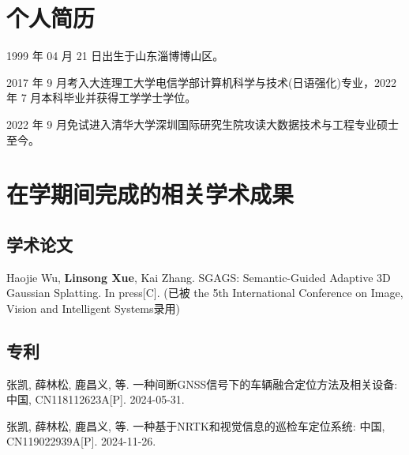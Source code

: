 
\begin{resume}

  \section*{个人简历}

  1999 年 04 月 21 日出生于山东淄博博山区。

  2017 年 9 月考入大连理工大学电信学部计算机科学与技术(日语强化)专业，2022 年 7 月本科毕业并获得工学学士学位。

  2022 年 9 月免试进入清华大学深圳国际研究生院攻读大数据技术与工程专业硕士至今。


  \section*{在学期间完成的相关学术成果}

  \subsection*{学术论文}

  \begin{achievements}
    \item Haojie Wu, \textbf{Linsong Xue}, Kai Zhang. SGAGS: Semantic-Guided Adaptive 3D Gaussian Splatting. In press[C]. (已被 the 5th International Conference on Image, Vision and Intelligent Systems录用)
  \end{achievements}


  \subsection*{专利}

  \begin{achievements}
    \item 张凯, 薛林松, 鹿昌义, 等. 一种间断GNSS信号下的车辆融合定位方法及相关设备: 中国, CN118112623A[P]. 2024-05-31.
    \item 张凯, 薛林松, 鹿昌义, 等. 一种基于NRTK和视觉信息的巡检车定位系统: 中国, CN119022939A[P]. 2024-11-26.
  \end{achievements}

\end{resume}
